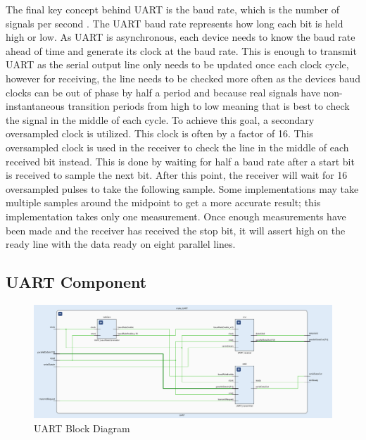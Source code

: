 \documentclass[11pt]{article}
\begin{document}
The final key concept behind UART is the baud rate, which is the number of signals per second \cite{baudrate}.
The UART baud rate represents how long each bit is held high or low.
As UART is asynchronous, each device needs to know the baud rate ahead of time and generate its clock at the baud rate.
This is enough to transmit UART as the serial output line only needs to be updated once each clock cycle,
however for receiving, the line needs to be checked more often as the devices baud clocks can be out of phase by half a period and because real signals have non-instantaneous transition periods from high to low meaning that is best to check the signal in the middle of each cycle.
To achieve this goal, a secondary oversampled clock is utilized.
This clock is often by a factor of 16.
This oversampled clock is used in the receiver to check the line in the middle of each received bit instead.
This is done by waiting for half a baud rate after a start bit is received to sample the next bit.
After this point, the receiver will wait for 16 oversampled pulses to take the following sample.
Some implementations may take multiple samples around the midpoint to get a more accurate result; this implementation takes only one measurement.
Once enough measurements have been made and the receiver has received the stop bit, it will assert high on the ready line with the data ready on eight parallel lines.


\subsection{UART Component}
\begin{figure}[H]        
    \centering
    \includegraphics[width=\textwidth]{uartImp.png}
    \caption{UART Block Diagram}
    \label{fig:UARTimp}
\end{figure} 
\end{document}
